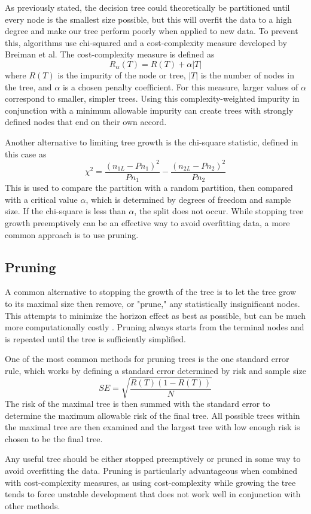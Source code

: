 \documentclass[12pt,english,letterpaper]{article}
\begin{document}
As previously stated, the decision tree could theoretically be partitioned until every node is the smallest size possible, but this will overfit the data to a high degree and make our tree perform poorly when applied to new data. To prevent this, algorithms use chi-squared and a cost-complexity measure developed by Breiman et al. The cost-complexity measure is defined as
\[R_\alpha(T)=R(T)+\alpha|T|\]
where $R(T)$ is the impurity of the node or tree, $|T|$ is the number of nodes in the tree, and $\alpha$ is a chosen penalty coefficient. For this measure, larger values of $\alpha$ correspond to smaller, simpler trees. Using this complexity-weighted impurity in conjunction with a minimum allowable impurity can create trees with strongly defined nodes that end on their own accord.

Another alternative to limiting tree growth is the chi-square statistic, defined in this case as
\[
\chi ^2=\frac{(n_{1L}-Pn_1)^2}{Pn_1}-\frac{(n_{2L}-Pn_2)^2}{Pn_2}
\]
This is used to compare the partition with a random partition, then compared with a critical value $\alpha$, which is determined by degrees of freedom and sample size. If the chi-square is less than $\alpha$, the split does not occur. While stopping tree growth preemptively can be an effective way to avoid overfitting data, a more common approach is to use pruning.

\subsection*{Pruning}
A common alternative to stopping the growth of the tree is to let the tree grow to its maximal size then remove, or "prune," any statistically insignificant nodes. This attempts to minimize the horizon effect as best as possible, but can be much more computationally costly \cite{duda}. Pruning always starts from the terminal nodes and is repeated until the tree is sufficiently simplified.

One of the most common methods for pruning trees is the one standard error rule, which works by defining a standard error determined by risk and sample size
\[SE=\sqrt{\frac{R(T)(1-R(T))}{N}}\]
The risk of the maximal tree is then summed with the standard error to determine the maximum allowable risk of the final tree. All possible trees within the maximal tree are then examined and the largest tree with low enough risk is chosen to be the final tree. \cite{ma}

Any useful tree should be either stopped preemptively or pruned in some way to avoid overfitting the data. Pruning is particularly advantageous when combined with cost-complexity measures, as using cost-complexity while growing the tree tends to force unstable development that does not work well in conjunction with other methods.
\end{document}
